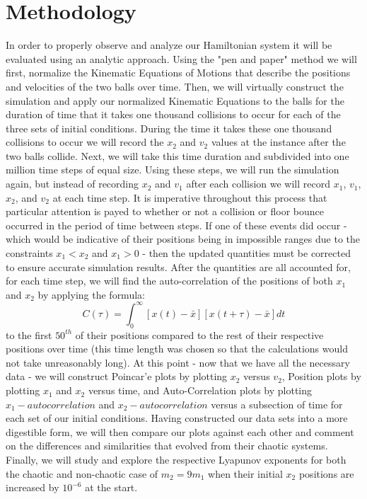 \documentclass[twocolumn]{article}
\begin{document}
\section{Methodology}
\hspace{\parindent} 
In order to properly observe and analyze our Hamiltonian system it will be evaluated using an analytic approach. Using the "pen and paper" method we will first, normalize the Kinematic Equations of Motions that describe the positions and velocities of the two balls over time. Then, we will virtually construct the simulation and apply our normalized Kinematic Equations to the balls for the duration of time that it takes one thousand collisions to occur for each of the three sets of initial conditions. During the time it takes these one thousand collisions to occur we will record the $x_2$ and $v_2$ values at the instance after the two balls collide. Next, we will take this time duration and subdivided into one million time steps of equal size. Using these steps, we will run the simulation again, but instead of recording $x_2$ and $v_1$ after each collision we will record $x_1$, $v_1$, $x_2$, and $v_2$ at each time step. It is imperative throughout this process that particular attention is payed to whether or not a collision or floor bounce occurred in the period of time between steps. If one of these events did occur - which would be indicative of their positions being in impossible ranges due to the constraints $x_1<x_2$ and $x_1>0$ - then the updated quantities must be corrected to ensure accurate simulation results. After the quantities are all accounted for, for each time step, we will find the auto-correlation of the positions of both $x_1$ and $x_2$ by applying the formula:
$$C(\tau)=\int_{0}^{\infty}[x(t)-\bar{x}][x(t+\tau)-\bar{x}]dt$$
to the first $50^{th}$ of their positions compared to the rest of their respective positions over time (this time length was chosen so that the calculations would not take unreasonably long). At this point - now that we have all the necessary data - we will construct Poincar'e plots by plotting $x_2$ versus $v_2$, Position plots by plotting $x_1$ and $x_2$ versus time, and Auto-Correlation plots by plotting $x_1-autocorrelation$ and $x_2-autocorrelation$ versus a subsection of time for each set of our initial conditions. Having constructed our data sets into a more digestible form, we will then compare our plots against each other and comment on the differences and similarities that evolved from their chaotic systems. Finally, we will study and explore the respective Lyapunov exponents for both the chaotic and non-chaotic case of $m_2=9m_1$ when their initial $x_2$ positions are increased by $10^{-6}$ at the start.
\end{document}

